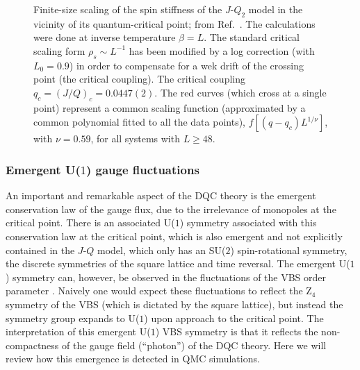 \documentclass[range]{ar2e}
\begin{document}
\begin{figure}
\centerline{}
\caption{Finite-size scaling of the spin stiffness of the $J$-$Q_2$ model in the vicinity of its quantum-critical point; from Ref.~\cite{Sandvik10c}. The 
calculations were done at inverse temperature $\beta=L$. The standard critical scaling form $\rho_s \sim L^{-1}$ has been modified by a log correction 
(with $L_0=0.9$) in order to compensate for a wek drift of the crossing point (the critical coupling). The critical coupling $q_c=(J/Q)_c = 0.0447(2)$. The
red curves (which cross at a single point) represent a common scaling function (approximated by a common polynomial fitted to all the data points), 
$f[(q-q_c)L^{1/\nu}]$, with $\nu=0.59$, for all systems with $L\ge 48$.}
\label{jqrhos}
\end{figure}

\subsubsection{Emergent U($1$) gauge fluctuations}

An important and remarkable aspect of the DQC theory is the emergent conservation law of the gauge flux, due to the irrelevance of monopoles at the critical point. 
There is an associated U($1$) symmetry associated with this conservation law at the critical point, which is also emergent and not explicitly contained in 
the $J$-$Q$ model, which only has an SU($2$) spin-rotational symmetry, the discrete symmetries of the square lattice and time reversal. The emergent U($1$) 
symmetry can, however, be observed in the fluctuations of the VBS order parameter \cite{Sandvik07}. Naively one would expect these fluctuations 
to reflect the Z$_4$ symmetry of the VBS (which is dictated by the square lattice), but instead the symmetry group expands to U($1$) upon approach to the 
critical point. The interpretation of this emergent U($1$) VBS symmetry is that it reflects the non-compactness of the gauge field (``photon'') 
of the DQC theory. Here we will review how this emergence is detected in QMC simulations.
\end{document}

